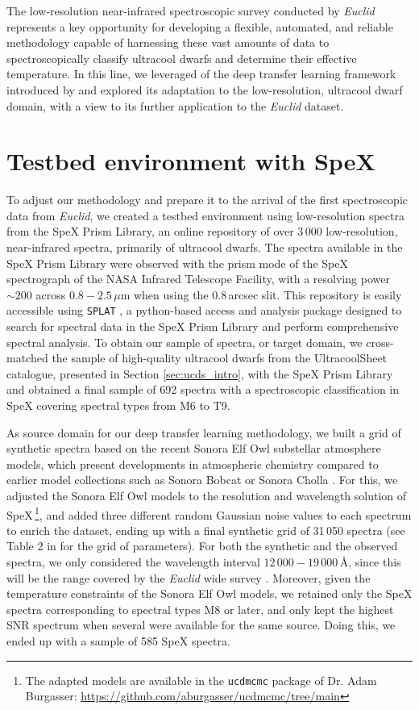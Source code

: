 The low-resolution near-infrared spectroscopic survey conducted by \textit{Euclid} represents a key opportunity for developing a flexible, automated, and reliable methodology capable of harnessing these vast amounts of data to spectroscopically classify ultracool dwarfs and determine their effective temperature. In this line, we leveraged of the deep transfer learning framework introduced by \citet{masbuitrago2024} and explored its adaptation to the low-resolution, ultracool dwarf domain, with a view to its further application to the \textit{Euclid} dataset.


\section{Testbed environment with SpeX}


To adjust our methodology and prepare it to the arrival of the first spectroscopic data from \textit{Euclid}, we created a testbed environment using low-resolution spectra from the SpeX Prism Library, an online repository of over 3\,000 low-resolution, near-infrared spectra, primarily of ultracool dwarfs. The spectra available in the SpeX Prism Library were observed with the prism mode of the SpeX spectrograph \citep{Rayner2003} of the NASA Infrared Telescope Facility, with a resolving power $\sim200$ across $0.8-2.5$\,$\mu$m when using the 0.8\,arcsec slit. This repository is easily accessible using \texttt{SPLAT} \citep{splat}, a python-based access and analysis package designed to search for spectral data in the SpeX Prism Library and perform comprehensive spectral analysis. To obtain our sample of spectra, or target domain, we cross-matched the sample of high-quality ultracool dwarfs from the UltracoolSheet catalogue, presented in Section \ref{sec:ucds_intro}, with the SpeX Prism Library and obtained a final sample of 692 spectra with a spectroscopic classification in SpeX covering spectral types from M6 to T9.

As source domain for our deep transfer learning methodology, we built a grid of synthetic spectra based on the recent Sonora Elf Owl \citep{elfowl} substellar atmosphere models, which present developments in atmospheric chemistry compared to earlier model collections such as Sonora Bobcat \citep{bobcat} or Sonora Cholla \citep{cholla}. For this, we adjusted the Sonora Elf Owl models to the resolution and wavelength solution of SpeX\,\footnote{The adapted models are available in the \texttt{ucdmcmc} package of Dr. Adam Burgasser: \url{https://github.com/aburgasser/ucdmcmc/tree/main}}, and added three different random Gaussian noise values to each spectrum to enrich the dataset, ending up with a final synthetic grid of 31\,050 spectra (see Table 2 in \citealt{elfowl} for the grid of parameters). For both the synthetic and the observed spectra, we only considered the wavelength interval $12\,000-19\,000$\,\AA, since this will be the range covered by the \textit{Euclid} wide survey \citep{euclid2023}. Moreover, given the temperature constraints of the Sonora Elf Owl models, we retained only the SpeX spectra corresponding to spectral types M8 or later, and only kept the highest SNR spectrum when several were available for the same source. Doing this, we ended up with a sample of 585 SpeX spectra.

